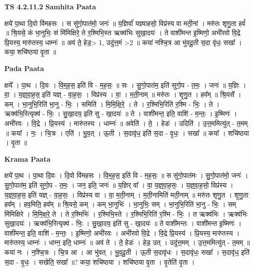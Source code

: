 \documentclass[17pt]{extarticle}
\begin{document}
\textbf{TS 4.2.11.2 } \newline
\textbf{Samhita Paata} \newline

क्षये॑ पा॒था दि॒वो वि॑महसः । स सु॑गो॒पात॑मो॒ जनः॑ ॥ य॒ज्ञिर्वा॑ यज्ञ्वाहसो॒ विप्र॑स्य वा मती॒नां । मरु॑तः शृणु॒ता हवं᳚ ॥ श्रि॒यसे॒ कं भा॒नुभिः॒ सं मि॑मिक्षिरे॒ ते र॒श्मिभि॒स्त ऋक्व॑भिः सुखा॒दयः॑ । ते वाशी॑मन्त इ॒ष्मिणो॒ अभी॑रवो वि॒द्रे प्रि॒यस्य॒ मारु॑तस्य॒ धाम्नः॑ ॥ अव॑ ते॒ हेड॒> 1, उदु॑त्त॒मं >2 ॥ कया॑ नश्चि॒त्र आ भु॑वदू॒ती स॒दा वृ॑धः॒ सखा᳚ । कया॒ शचि॑ष्ठया वृ॒ता ॥ \newline

\textbf{Pada Paata} \newline

क्षये᳚ । पा॒थ । दि॒वः । वि॒म॒ह॒स॒ इति॑ वि - म॒ह॒सः॒ ॥ सः । सु॒गो॒पात॑म॒ इति॑ सुगो॒प - त॒मः॒ । जनः॑ ॥ य॒ज्ञिः । वा॒ । य॒ज्ञ्॒वा॒ह॒स॒ इति॑ यज्ञ् - वा॒ह॒सः॒ । विप्र॑स्य । वा॒ । म॒ती॒नाम् ॥ मरु॑तः । शृ॒णु॒त । हव᳚म् ॥ श्रि॒यसे᳚ । कम् । भा॒नुभि॒रिति॑ भा॒नु - भिः॒ । समिति॑ । मि॒मि॒क्षि॒रे॒ । ते । र॒श्मिभि॒रिति॑ र॒श्मि - भिः॒ । ते । ऋक्व॑भि॒रित्यृक्व॑ - भिः॒ । सु॒खा॒दय॒ इति॑ सु - खा॒दयः॑ ॥ ते । वाशी॑मन्त॒ इति॒ वाशि॑ - म॒न्तः॒ । इ॒ष्मिणः॑ । अभी॑रवः । वि॒द्रे । प्रि॒यस्य॑ । मारु॑तस्य । धाम्नः॑ ॥ अवेति॑ । ते॒ । हेडः॑ । उदिति॑ । उ॒त्त॒ममित्यु॑त् - त॒मम् ॥ कया᳚ । नः॒ । चि॒त्रः । एति॑ । भु॒व॒त् । ऊ॒ती । स॒दावृ॑ध॒ इति॑ स॒दा - वृ॒धः॒ । सखा᳚ ॥ कया᳚ । शचि॑ष्ठया । वृ॒ता ॥  \newline


\textbf{Krama Paata} \newline

क्षये॑ पा॒थ । पा॒था दि॒वः । दि॒वो वि॑महसः । वि॒म॒ह॒स॒ इति॑ वि - म॒ह॒सः॒ ॥ स सु॑गो॒पात॑मः । सु॒गो॒पात॑मो॒ जनः॑ । सु॒गो॒पात॑म॒ इति॑ सुगो॒प - त॒मः॒ । जन॒ इति॒ जनः॑ ॥ य॒ज्ञिर् वा᳚ । वा॒ य॒ज्ञ्॒वा॒ह॒सः॒ । य॒ज्ञ्॒वा॒ह॒सो॒ विप्र॑स्य । य॒ज्ञ्॒वा॒ह॒स॒ इति॑ यज्ञ् - वा॒ह॒सः॒ । विप्र॑स्य वा । वा॒ म॒ती॒नाम् । म॒ती॒नामिति॑ मती॒नाम् ॥ मरु॑तः शृणु॒त । शृ॒णु॒ता हव᳚म् । हव॒मिति॒ हव᳚म् ॥ श्रि॒यसे॒ कम् । कम् भा॒नुभिः॑ । भा॒नुभिः॒ सम् । भा॒नुभि॒रिति॑ भा॒नु - भिः॒ । सम् मि॑मिक्षिरे । मि॒मि॒क्ष॒रे॒ ते । ते र॒श्मिभिः॑ । र॒श्मिभि॒स्ते । र॒श्मिभि॒रिति॑ र॒श्मि - भिः॒ । त ऋक्व॑भिः । ऋक्व॑भिः सुखा॒दयः॑ । ऋक्व॑भि॒रित्यृक्व॑ - भिः॒ । सु॒खा॒दय॒ इति॑ सु - खा॒दयः॑ ॥ ते वाशी॑मन्तः । वाशी॑मन्त इ॒ष्मिणः॑ । वाशी॑मन्त॒ इति॒ वाशि॑ - म॒न्तः॒ । इ॒ष्मिणो॒ अभी॑रवः । अभी॑रवो वि॒द्रे । वि॒द्रे प्रि॒यस्य॑ । प्रि॒यस्य॒ मारु॑तस्य । मारु॑तस्य॒ धाम्नः॑ । धाम्न॒ इति॒ धाम्नः॑ ॥ अव॑ ते । ते॒ हेडः॑ । हेड॒ उत् । उदु॑त्त॒मम् । उ॒त्त॒ममित्यु॑त् - त॒मम् ॥ कया॑ नः । न॒श्चि॒त्रः । चि॒त्र आ । आ भु॑वत् । भु॒व॒दू॒ती । ऊ॒ती स॒दावृ॑धः । स॒दावृ॑धः॒ सखा᳚ । स॒दावृ॑ध॒ इति॑ स॒दा - वृ॒धः॒ । सखेति॒ सखा᳚ ॥? कया॒ शचि॑ष्ठया । शचि॑ष्ठया वृ॒ता । वृ॒तेति॑ वृ॒ता । \newline
\end{document}
